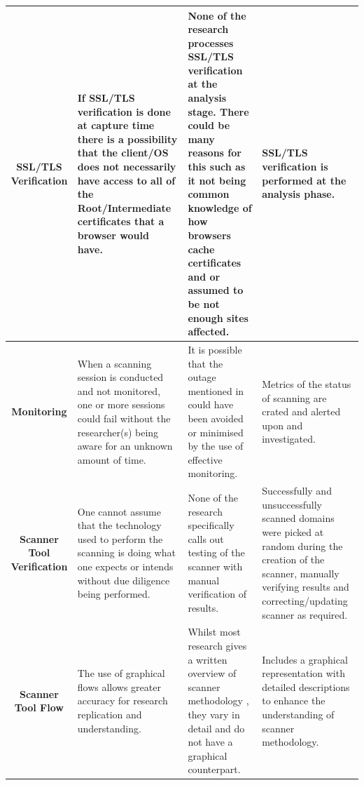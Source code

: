 \documentclass{mscreport}
\begin{document}
\begin{center}
\begin{longtable}{|C|E|H|H|}
      \hline
      \textbf{SSL/TLS Verification} & If SSL/TLS verification is done at capture time there is a possibility that the client/OS does not necessarily have access to all of the Root/Intermediate certificates that a browser would have. & None of the research \cite{Patil2017-bg,Buchanan2018-xz,Amann2017-co,Kotzias2018-wd,Poteat2021-zr,Roth2020-hg,Van_Goethem2014-ao,Chen2016-dl,Kumar2017-qw,Calzavara2018-xv,Holz2020-ha,Michael2015-hn,} processes SSL/TLS verification at the analysis stage. There could be many reasons for this such as it not being common knowledge of how browsers cache certificates and or assumed to be not enough sites affected. & SSL/TLS verification is performed at the analysis phase. \\
      \hline
      \textbf{Monitoring} & When a scanning session is conducted and not monitored, one or more sessions could fail without the researcher(s) being aware for an unknown amount of time. & It is possible that the outage mentioned in \cite{Poteat2021-zr} could have been avoided or minimised by the use of effective monitoring. & Metrics of the status of scanning are crated and alerted upon and investigated. \\
      \hline
      \textbf{Scanner Tool Verification} & One cannot assume that the technology used to perform the scanning is doing what one expects or intends without due diligence being performed. & None of the research specifically calls out testing of the scanner with manual verification of results. & Successfully and unsuccessfully scanned domains were picked at random during the creation of the scanner, manually verifying results and correcting/updating scanner as required. \\
      \hline
      \textbf{Scanner Tool Flow} & The use of graphical flows allows greater accuracy for research replication and understanding. & Whilst most research gives a written overview of scanner methodology \cite{Buchanan2018-xz,Amann2017-co,Patil2017-bg,Kotzias2018-wd,Poteat2021-zr,Van_Goethem2014-ao,Chen2016-dl,Kumar2017-qw,Holz2020-ha,Michael2015-hn}, they vary in detail and do not have a graphical counterpart. & Includes a graphical representation with detailed descriptions to enhance the understanding of scanner methodology. \\
\end{longtable}
\end{center}
\end{document}
